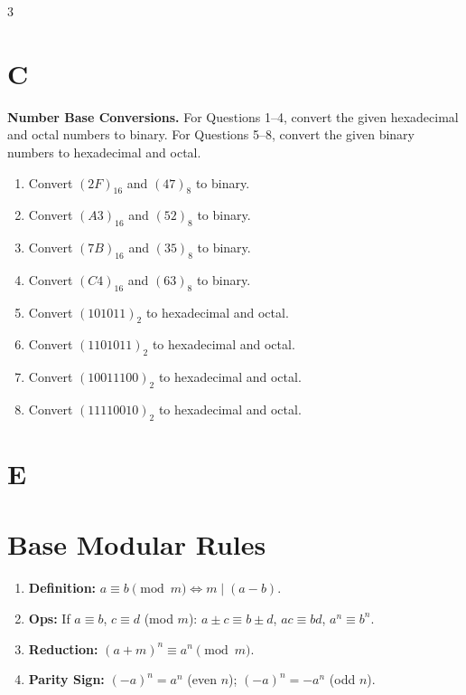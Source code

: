 \documentclass[9pt]{article}
\begin{document}
\begin{multicols}{3}
\section*{C}

\textbf{Number Base Conversions.} 
For Questions 1–4, convert the given hexadecimal and octal numbers to binary.  
For Questions 5–8, convert the given binary numbers to hexadecimal and octal.

\begin{enumerate}
    \item Convert $(2F)_{16}$ and $(47)_8$ to binary.
    \item Convert $(A3)_{16}$ and $(52)_8$ to binary.
    \item Convert $(7B)_{16}$ and $(35)_8$ to binary.
    \item Convert $(C4)_{16}$ and $(63)_8$ to binary.

    \item Convert $(101011)_2$ to hexadecimal and octal.
    \item Convert $(1101011)_2$ to hexadecimal and octal.
    \item Convert $(10011100)_2$ to hexadecimal and octal.
    \item Convert $(11110010)_2$ to hexadecimal and octal.
\end{enumerate}


\section*{E}
\section*{Base Modular Rules}

\begin{enumerate}
\item[\textbf{R1}] \textbf{Definition:} 
\(a \equiv b \pmod m \iff m \mid (a - b)\).

\item[\textbf{R2}] \textbf{Ops:} If \(a \equiv b\), \(c \equiv d\) (mod \(m\)):
\(a\pm c \equiv b\pm d\),
\(ac \equiv bd\),
\(a^n \equiv b^n\).

\item[\textbf{R3}] \textbf{Reduction:} 
\((a+m)^n \equiv a^n \pmod m\).

\item[\textbf{R4}] \textbf{Parity Sign:} 
\((-a)^n = a^n\) (even \(n\)); 
\((-a)^n = -a^n\) (odd \(n\)).


\end{enumerate}
\end{multicols}
\end{document}
